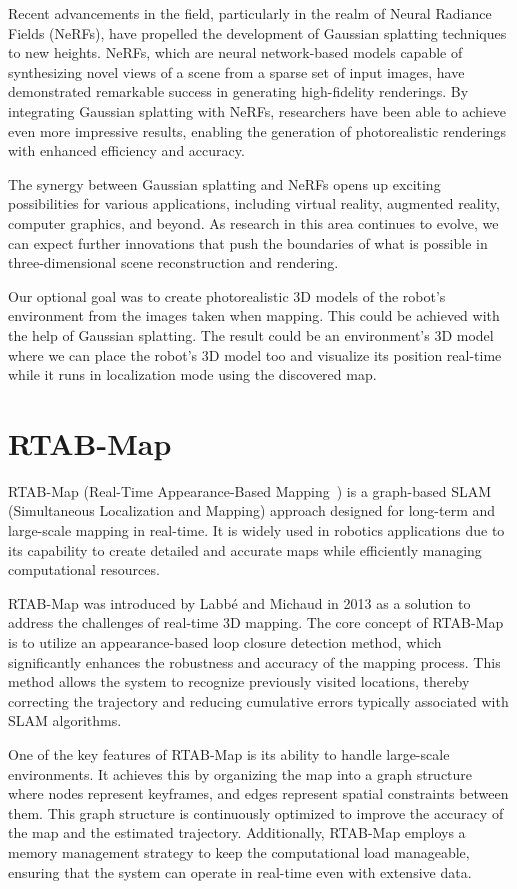 Recent advancements in the field, particularly in the realm of Neural Radiance Fields\cite{nerf} (NeRFs), have propelled the development of Gaussian splatting techniques to new heights. NeRFs, which are neural network-based models capable of synthesizing novel views of a scene from a sparse set of input images, have demonstrated remarkable success in generating high-fidelity renderings. By integrating Gaussian splatting with NeRFs, researchers have been able to achieve even more impressive results, enabling the generation of photorealistic renderings with enhanced efficiency and accuracy.

The synergy between Gaussian splatting and NeRFs opens up exciting possibilities for various applications, including virtual reality, augmented reality, computer graphics, and beyond. As research in this area continues to evolve, we can expect further innovations that push the boundaries of what is possible in three-dimensional scene reconstruction and rendering.

Our optional goal was to create photorealistic 3D models of the robot's environment from the images taken when mapping. This could be achieved with the help of Gaussian splatting. The result could be an environment's 3D model where we can place the robot's 3D model too and visualize its position real-time while it runs in localization mode using the discovered map.

\section{RTAB-Map}

RTAB-Map (Real-Time Appearance-Based Mapping~\cite{RTAB_Map_docs}) is a graph-based SLAM (Simultaneous Localization and Mapping) approach designed for long-term and large-scale mapping in real-time. It is widely used in robotics applications due to its capability to create detailed and accurate maps while efficiently managing computational resources.

RTAB-Map was introduced by Labbé and Michaud in 2013 as a solution to address the challenges of real-time 3D mapping. The core concept of RTAB-Map is to utilize an appearance-based loop closure detection method, which significantly enhances the robustness and accuracy of the mapping process. This method allows the system to recognize previously visited locations, thereby correcting the trajectory and reducing cumulative errors typically associated with SLAM algorithms.

One of the key features of RTAB-Map is its ability to handle large-scale environments. It achieves this by organizing the map into a graph structure where nodes represent keyframes, and edges represent spatial constraints between them. This graph structure is continuously optimized to improve the accuracy of the map and the estimated trajectory. Additionally, RTAB-Map employs a memory management strategy to keep the computational load manageable, ensuring that the system can operate in real-time even with extensive data.

